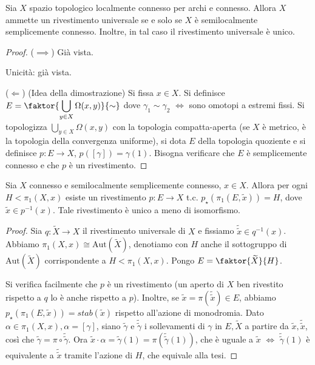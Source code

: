 \begin{thm}
  Sia $X$ spazio topologico localmente connesso per archi e connesso. Allora $X$ ammette un rivestimento universale se e solo se $X$ è semilocalmente semplicemente connesso. Inoltre, in tal caso il rivestimento universale è unico.
\end{thm}

\begin{proof}
  ($\implies$) Già vista.

  Unicità: già vista.

  ($\Leftarrow$) (Idea della dimostrazione) Si fissa $x \in X$. Si definisce $\displaystyle E= \faktor{\bigcup_{y \in X}\Omega(x, y)}{\sim}$ dove $\gamma_1 \sim \gamma_2$ $\iff$ sono omotopi a estremi fissi.
  Si topologizza $\displaystyle \bigcup_{y \in X} \Omega(x, y)$ con la topologia compatta-aperta (se $X$ è metrico, è la topologia della convergenza uniforme), si dota $E$ della topologia quoziente e si definisce $p:E \longrightarrow X$, $p([\gamma])=\gamma(1)$. Bisogna verificare che $E$ è semplicemente connesso e che $p$ è un rivestimento.
\end{proof}

\begin{thm}
  Sia $X$ connesso e semilocalmente semplicemente connesso, $x \in X$. Allora per ogni $H<\pi_1(X, x)$ esiste un rivestimento $p:E \longrightarrow X$ t.c. $p_{\star}(\pi_1(E, \tilde{x}))=H$, dove $\tilde{x} \in p^{-1}(x)$. Tale rivestimento è unico a meno di isomorfismo.
\end{thm}

\begin{proof}
  Sia $q:\widetilde{X} \longrightarrow X$ il rivestimento universale di $X$ e fissiamo $\tilde{\tilde{x}} \in q^{-1}(x)$. Abbiamo $\pi_1(X, x) \cong \text{Aut}(\widetilde{X})$, denotiamo con $H$ anche il sottogruppo di $\text{Aut}(\widetilde{X})$ corrispondente a $H<\pi_1(X, x)$. Pongo $E=\faktor{\widetilde{X}}{H}$.
  \begin{center}
  \end{center}
  Si verifica facilmente che $p$ è un rivestimento (un aperto di $X$ ben rivestito rispetto a $q$ lo è anche rispetto a $p$). Inoltre, se $\tilde{x}=\pi(\tilde{\tilde{x}}) \in E$, abbiamo $p_{\star}(\pi_1(E, \tilde{x}))=stab(\tilde{x})$ rispetto all'azione di monodromia.
  Dato $\alpha \in \pi_1(X, x), \alpha=[\gamma]$, siano $\tilde{\gamma}$ e $\tilde{\tilde{\gamma}}$ i sollevamenti di $\gamma$ in $E, \widetilde{X}$ a partire da $\tilde{x}, \tilde{\tilde{x}}$, così che $\tilde{\gamma}=\pi \circ \tilde{\tilde{\gamma}}$.
  Ora $\tilde{x}\cdot\alpha=\tilde{\gamma}(1)=\pi(\tilde{\tilde{\gamma}}(1))$, che è uguale a $\tilde{x}$ $\iff$ $\tilde{\tilde{\gamma}}(1)$ è equivalente a $\tilde{\tilde{x}}$ tramite l'azione di $H$, che equivale alla tesi.
\end{proof}

